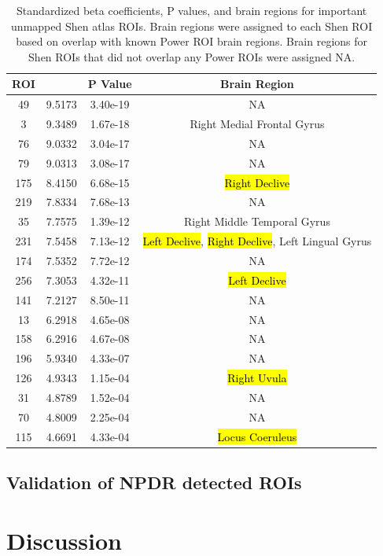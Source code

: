 \documentclass[10pt,letterpaper]{article}\usepackage[]{graphicx}\usepackage[]{color}
\begin{document}
\begin{table}[h!]
	\centering
	\caption{Standardized beta coefficients, P values, and brain regions for important unmapped Shen atlas ROIs. Brain regions were assigned to each Shen ROI based on overlap with known Power ROI brain regions. Brain regions for Shen ROIs that did not overlap any Power ROIs were assigned NA.}\label{tab:unmapped-shen-tab}
\begin{tabular}[h!]{cccc}\toprule
	\textbf{ROI} & \bm{$\beta_a$} & \textbf{P Value} & \textbf{Brain Region} \\ \midrule
	49 & 9.5173 & 3.40e-19 & NA \\
	3 & 9.3489 & 1.67e-18 & Right Medial Frontal Gyrus \\
	76 & 9.0332 & 3.04e-17 & NA \\
	79 & 9.0313 & 3.08e-17 & NA \\
	175 & 8.4150 & 6.68e-15 & \hl{Right Declive} \\
	219 & 7.8334 & 7.68e-13 & NA\\
	35 & 7.7575 & 1.39e-12 & Right Middle Temporal Gyrus\\
	231 & 7.5458 & 7.13e-12 & \hl{Left Declive}, \hl{Right Declive}, Left Lingual Gyrus\\
	174 & 7.5352 & 7.72e-12 & NA \\
	256 & 7.3053 & 4.32e-11 & \hl{Left Declive} \\
	141 & 7.2127 & 8.50e-11 & NA \\
	13 & 6.2918 & 4.65e-08 & NA \\
	158 & 6.2916 & 4.67e-08 & NA \\
	196 & 5.9340 & 4.33e-07 & NA \\
	126 & 4.9343 & 1.15e-04 & \hl{Right Uvula} \\
	31 & 4.8789 & 1.52e-04 & NA \\
	70 & 4.8009 & 2.25e-04 & NA \\
	115 & 4.6691 & 4.33e-04 & \hl{Locus Coeruleus} \\ \bottomrule
\end{tabular}
\end{table}

\subsection{Validation of NPDR detected ROIs}

\section{Discussion}


\end{document}
